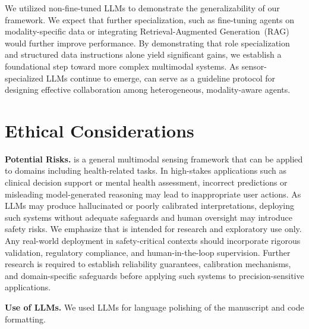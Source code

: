 We utilized non-fine-tuned LLMs to demonstrate the generalizability of our framework. We expect that further specialization, such as fine-tuning agents on modality-specific data or integrating Retrieval-Augmented Generation~(RAG) would further improve performance. By demonstrating that role specialization and structured data instructions alone yield significant gains, we establish a foundational step toward more complex multimodal systems. As sensor-specialized LLMs continue to emerge, \system{} can serve as a guideline protocol for designing effective collaboration among heterogeneous, modality-aware agents.


\section*{Ethical Considerations}
\label{sec:ethical_considerations}

\noindent \textbf{Potential Risks.} \system{} is a general multimodal sensing framework that can be applied to domains including health-related tasks. In high-stakes applications such as clinical decision support or mental health assessment, incorrect predictions or misleading model-generated reasoning may lead to inappropriate user actions. As LLMs may produce hallucinated or poorly calibrated interpretations, deploying such systems without adequate safeguards and human oversight may introduce safety risks. We emphasize that \system{} is intended for research and exploratory use only. Any real-world deployment in safety-critical contexts should incorporate rigorous validation, regulatory compliance, and human-in-the-loop supervision. Further research is required to establish reliability guarantees, calibration mechanisms, and domain-specific safeguards before applying such systems to precision-sensitive applications.

\noindent \textbf{Use of LLMs.} We used LLMs for language polishing of the manuscript and code formatting.
